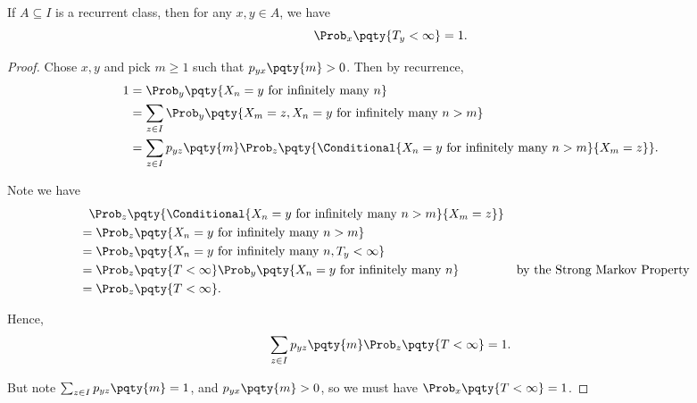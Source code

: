 \begin{theorem}
    If \(A \subseteq I\) is a recurrent class, then for any \(x, y \in A\), we have
    \[
        \Prob_x \pqty{T_y < \infty} = 1.
    \]
\end{theorem}

\begin{proof}
    Chose \(x, y\) and pick \(m \geq 1\) such that \(p_{yx} \pqty{m} > 0\). Then by recurrence,
    \begin{align*}
        1 &= \Prob_y \pqty{X_n = y \text{ for infinitely many } n} \\
        &= \sum_{z \in I} \Prob_y \pqty{X_m = z, X_n = y \text{ for infinitely many } n > m} \\
        &= \sum_{z \in I} p_{yz} \pqty{m} \Prob_z \pqty{\Conditional{X_n = y \text{ for infinitely many } n > m}{X_m = z}}.
    \end{align*}

    Note we have
    \begin{align*}
        &\phantom{=} \Prob_z \pqty{\Conditional{X_n = y \text{ for infinitely many } n > m}{X_m = z}} \\
        &= \Prob_z \pqty{X_n = y \text{ for infinitely many } n > m} \\
        &= \Prob_z \pqty{X_n = y \text{ for infinitely many } n, T_y < \infty} \\
        &= \Prob_z \pqty{T < \infty} \Prob_y \pqty{X_n = y \text{ for infinitely many } n} && \text{by the Strong Markov Property} \\
        &= \Prob_z \pqty{T < \infty}.
    \end{align*}

    Hence,
    \[
        \sum_{z \in I} p_{yz} \pqty{m} \Prob_z \pqty{T < \infty} = 1.
    \]

    But note \(\sum_{z \in I} p_{yz} \pqty{m} = 1\), and \(p_{yx} \pqty{m} > 0\), so we must have \(\Prob_x \pqty{T < \infty} = 1\).
\end{proof}